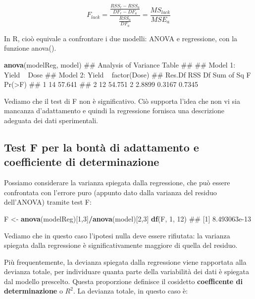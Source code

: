 \documentclass[a4paper,12pt,oneside]{book}
\newenvironment{Shaded}{\begin{snugshade}}{\end{snugshade}}
\newcommand{\KeywordTok}[1]{\textcolor[rgb]{0.13,0.29,0.53}{\textbf{#1}}}
\newcommand{\DecValTok}[1]{\textcolor[rgb]{0.00,0.00,0.81}{#1}}
\newcommand{\StringTok}[1]{\textcolor[rgb]{0.31,0.60,0.02}{#1}}
\newcommand{\OperatorTok}[1]{\textcolor[rgb]{0.81,0.36,0.00}{\textbf{#1}}}
\newcommand{\NormalTok}[1]{#1}
\theoremstyle{definition}
\theoremstyle{definition}
\theoremstyle{definition}
\theoremstyle{remark}
\begin{document}
\[ F_{lack} = \frac{\frac{RSS_r - RSS_a}{DF_r-DF_a} } {\frac{RSS_a}{DF_a}} = \frac{MS_{lack}}{MSE_a}\]

In R, cioò equivale a confrontare i due modelli: ANOVA e regressione,
con la funzione anova().

\begin{Shaded}
\begin{Highlighting}[]
\KeywordTok{anova}\NormalTok{(modelReg, model)}
\NormalTok{## Analysis of Variance Table}
\NormalTok{## }
\NormalTok{## Model 1: Yield ~ Dose}
\NormalTok{## Model 2: Yield ~ factor(Dose)}
\NormalTok{##   Res.Df    RSS Df Sum of Sq      F Pr(>F)}
\NormalTok{## 1     14 57.641                           }
\NormalTok{## 2     12 54.751  2    2.8899 0.3167 0.7345}
\end{Highlighting}
\end{Shaded}

Vediamo che il test di F non è significativo. Ciò supporta l'idea che
non vi sia mancanza d'adattamento e quindi la regressione fornisca una
descrizione adeguata dei dati sperimentali.

\subsection{Test F per la bontà di adattamento e coefficiente di
determinazione}\label{test-f-per-la-bonta-di-adattamento-e-coefficiente-di-determinazione}

Possiamo considerare la varianza spiegata dalla regressione, che può
essere confrontata con l'errore puro (appunto dato dalla varianza del
residuo dell'ANOVA) tramite test F:

\begin{Shaded}
\begin{Highlighting}[]
\NormalTok{F <-}\StringTok{ }\KeywordTok{anova}\NormalTok{(modelReg)[}\DecValTok{1}\NormalTok{,}\DecValTok{3}\NormalTok{]}\OperatorTok{/}\KeywordTok{anova}\NormalTok{(model)[}\DecValTok{2}\NormalTok{,}\DecValTok{3}\NormalTok{]}
\KeywordTok{df}\NormalTok{(F, }\DecValTok{1}\NormalTok{, }\DecValTok{12}\NormalTok{)}
\NormalTok{## [1] 8.493063e-13}
\end{Highlighting}
\end{Shaded}

Vediamo che in questo caso l'ipotesi nulla deve essere rifiutata: la
varianza spiegata dalla regressione è significativamente maggiore di
quella del residuo.

Più frequentemente, la devianza spiegata dalla regressione viene
rapportata alla devianza totale, per individuare quanta parte della
variabilità dei dati è spiegata dal modello prescelto. Questa
proporzione definisce il cosidetto \textbf{coefficente di
determinazione} o \(R^2\). La devianza totale, in questo caso è:
\end{document}

